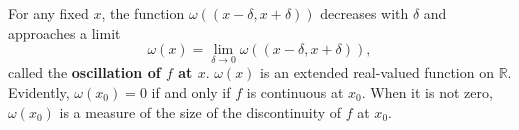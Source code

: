 For any fixed $x$, the function $\omega((x - \delta, x + \delta))$ decreases with $\delta$ and approaches a limit
$$\omega(x) = \lim_{\delta \to 0} \omega((x - \delta, x + \delta)),$$
called the \textbf{oscillation of $f$ at $x$}. $\omega(x)$ is an extended real-valued function on $\mathbb{R}$. Evidently, $\omega(x_0) = 0$ if and only if $f$ is continuous at $x_0$. When it is not zero, $\omega(x_0)$ is a measure of the size of the discontinuity of $f$ at $x_0$.

